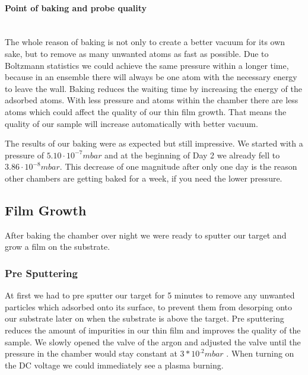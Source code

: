 \documentclass[]{article}
\begin{document}
\paragraph{Point of baking and probe quality} \mbox{} \\
The whole reason of baking is not only to create a better vacuum for its own sake, but to remove as many unwanted atoms as fast as possible. Due to Boltzmann statistics we could achieve the same pressure within a longer time, because in an ensemble there will always be one atom with the necessary energy to leave the wall. Baking reduces the waiting time by increasing the energy of the adsorbed atoms.
With less pressure and atoms within the chamber there are less atoms which could affect the quality of our thin film growth. That means the quality of our sample will increase automatically with better vacuum.

The results of our baking were as expected but still impressive. We started with a pressure of $5.10 \cdot 10^{-7} mbar$ and at the beginning of Day 2 we already fell to $3.86 \cdot 10^{-8} mbar $. This decrease of one magnitude after only one day is the reason other chambers are getting baked for a week, if you need the lower pressure.

\subsection{Film Growth}
After baking the chamber over night we were ready to sputter our target and grow a film on the substrate. 

\subsubsection{Pre Sputtering}
At first we had to pre sputter our target for 5 minutes to remove any unwanted particles which adsorbed onto its surface, to prevent them from desorping onto our substrate later on when the substrate is above the target. Pre sputtering reduces the amount of impurities in our thin film and improves the quality of the sample.  We slowly opened the valve of the argon and adjusted the valve until the pressure in the chamber would stay constant at $3*10^{.2}mbar$ . When turning on the DC voltage we could immediately see a plasma burning.
\end{document}
